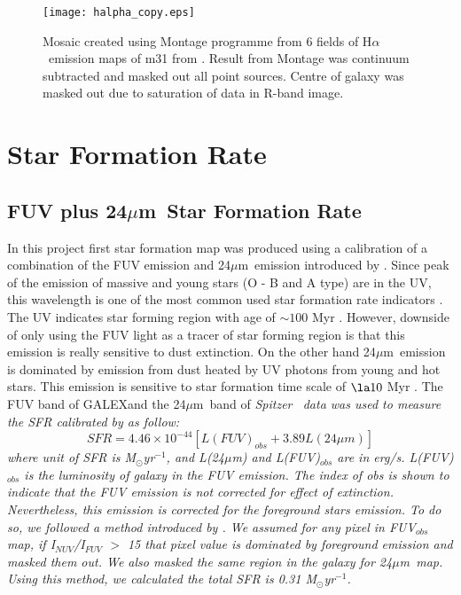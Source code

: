 \documentclass[useAMS,usenatbib]{mn2e}
\newcommand \halpha    {H$\alpha $\ }
\newcommand \um    {$\mu$m\ }
\newcommand \Spitzer {\it Spitzer}
\newcommand \Galex {GALEX}
\begin{document}
\begin{figure*}
 {\vfil  \texttt{[image: halpha\_copy.eps]}
  \caption{Mosaic created using Montage programme from 6 fields of \halpha emission maps of m31 from . Result from Montage was continuum subtracted and masked out all point sources. Centre of galaxy was masked out due to saturation of data in R-band image.\label{fig:halpha}}
 \vfil}
\end{figure*}


\section{Star Formation Rate}
\subsection{FUV plus 24\um Star Formation Rate}

In this project first star formation map was produced using a calibration of a combination of the FUV emission and 24\um emission introduced by \cite{Hao11}. Since peak of the emission of massive and young stars (O - B and A type) are in the UV, this wavelength is one of the most common used star formation rate indicators \citep[e.g.,][]{Kennicutt89}. The UV indicates star forming region with age of $\sim 100$ Myr \citep[e.g.,][]{Kennicutt98, Calzetti05}. However, downside of only using the FUV light as a tracer of star forming region is that this emission is really sensitive to dust extinction. On the other hand 24\um emission is dominated by emission from dust heated by UV photons from young and hot stars. This emission is sensitive to star formation time scale of $\la10$ Myr \citep{Calzetti07}.
The FUV band of \Galex and the 24\um band of \Spitzer ~ data was used to measure the SFR calibrated by \cite{Hao11} as follow:
\begin{equation}
\label{equ: fuvplus24}
SFR =4.46\times10^{-44}[L(FUV)_{obs}+3.89L(24\mu m)]
\end{equation}
where unit of SFR is M$_{\odot}$yr$^{-1}$, and L(24$\mu$m) and L(FUV)$_{obs}$ are in erg/s. L(FUV)$_{obs}$ is the luminosity of galaxy in the FUV emission. The index of obs is shown to indicate that the FUV emission is not corrected for effect of extinction. Nevertheless, this emission is corrected for the foreground stars emission. To do so, we followed a method introduced by \cite{Leroy08}. We assumed for any pixel in FUV$_{obs}$ map, %
if I$_{NUV}$/I$_{FUV}$ $>$ 15 that pixel value is dominated by foreground emission and masked them out. We also masked the same region in the galaxy for 24\um map. Using this method, we calculated the total SFR is 0.31 M$_{\odot}$yr$^{-1}$.
\end{document}
